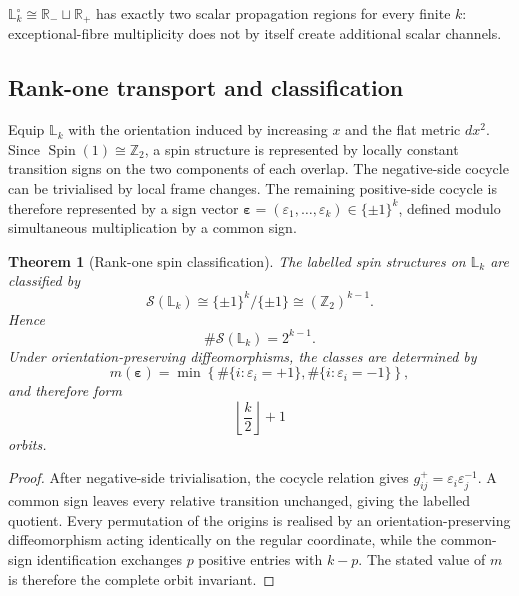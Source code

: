 \documentclass[11pt]{article}
\theoremstyle{plain}
\newtheorem{theorem}{Theorem}[section]
\theoremstyle{definition}
\begin{document}
\(\mathbb L_k^\circ \cong \mathbb R_-\sqcup\mathbb R_+\) has exactly two scalar propagation regions for every finite \(k\):
exceptional-fibre multiplicity does not by itself create additional scalar
channels.

\subsection{Rank-one transport and classification}
\label{subsec:Lk-labelled-classification}
\label{subsec:Lk-unitary-lines}

Equip \(\mathbb L_k\) with the orientation induced by increasing \(x\) and
the flat metric \(dx^2\). Since
\(\operatorname{Spin}(1)\cong\mathbb Z_2\),
a spin structure is represented by locally constant transition signs on the
two components of each overlap. The negative-side cocycle can be
trivialised by local frame changes. The remaining positive-side cocycle is
therefore represented by a sign vector
\(\boldsymbol{\varepsilon} = (\varepsilon_1,\ldots,\varepsilon_k) \in\{\pm1\}^k\),
defined modulo simultaneous multiplication by a common sign.

\begin{theorem}[Rank-one spin classification]
\label{thm:Lk-labelled-spin}
The labelled spin structures on \(\mathbb L_k\) are classified by
\[
  \mathscr S(\mathbb L_k)
  \cong
  \{\pm1\}^k/\{\pm1\}
  \cong
  (\mathbb Z_2)^{k-1}.
\]
Hence
\[
  \#\mathscr S(\mathbb L_k)=2^{k-1}.
\]
Under orientation-preserving diffeomorphisms, the classes are determined by
\[
  m(\boldsymbol{\varepsilon})
  =
  \min\left\{
    \#\{i:\varepsilon_i=+1\},
    \#\{i:\varepsilon_i=-1\}
  \right\},
\]
and therefore form
\[
  \left\lfloor\frac{k}{2}\right\rfloor+1
\]
orbits.
\end{theorem}

\begin{proof}
After negative-side trivialisation, the cocycle relation gives
\(g_{ij}^+ = \varepsilon_i\varepsilon_j^{-1}\).
A common sign leaves every relative transition unchanged, giving the
labelled quotient. Every permutation of the origins is realised by an
orientation-preserving diffeomorphism acting identically on the regular
coordinate, while the common-sign identification exchanges \(p\) positive
entries with \(k-p\). The stated value of \(m\) is therefore the complete
orbit invariant.
\end{proof}
\end{document}
